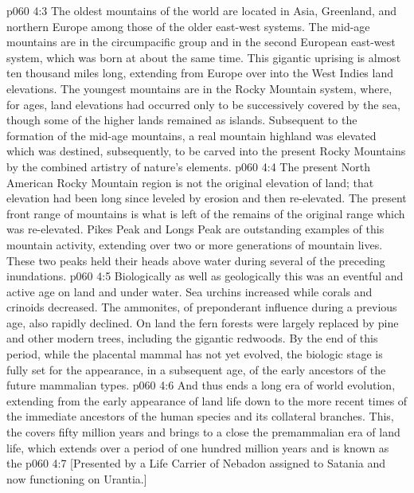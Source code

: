 \pc \vs p060 4:3 The oldest mountains of the world are located in Asia, Greenland, and northern Europe among those of the older east\hyp{}west systems. The mid\hyp{}age mountains are in the circumpacific group and in the second European east\hyp{}west system, which was born at about the same time. This gigantic uprising is almost ten thousand miles long, extending from Europe over into the West Indies land elevations. The youngest mountains are in the Rocky Mountain system, where, for ages, land elevations had occurred only to be successively covered by the sea, though some of the higher lands remained as islands. Subsequent to the formation of the mid\hyp{}age mountains, a real mountain highland was elevated which was destined, subsequently, to be carved into the present Rocky Mountains by the combined artistry of nature’s elements.
\vs p060 4:4 The present North American Rocky Mountain region is not the original elevation of land; that elevation had been long since leveled by erosion and then re\hyp{}elevated. The present front range of mountains is what is left of the remains of the original range which was re\hyp{}elevated. Pikes Peak and Longs Peak are outstanding examples of this mountain activity, extending over two or more generations of mountain lives. These two peaks held their heads above water during several of the preceding inundations.\plusone
\vs p060 4:5 Biologically as well as geologically this was an eventful and active age on land and under water. Sea urchins increased while corals and crinoids decreased. The ammonites, of preponderant influence during a previous age, also rapidly declined. On land the fern forests were largely replaced by pine and other modern trees, including the gigantic redwoods. By the end of this period, while the placental mammal has not yet evolved, the biologic stage is fully set for the appearance, in a subsequent age, of the early ancestors of the future mammalian types.
\pc \vs p060 4:6 And thus ends a long era of world evolution, extending from the early appearance of land life down to the more recent times of the immediate ancestors of the human species and its collateral branches. This, the  covers fifty million years and brings to a close the premammalian era of land life, which extends over a period of one hundred million years and is known as the 
\vsetoff
\vs p060 4:7 [Presented by a Life Carrier of Nebadon assigned to Satania and now functioning on Urantia.]
